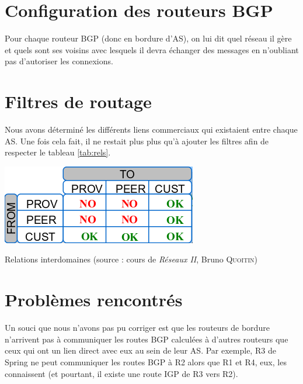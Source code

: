 \documentclass[10pt,a4paper,twocolumn]{article}
\begin{document}
\section{Configuration des routeurs BGP}
Pour chaque routeur BGP (donc en bordure d'AS), on lui dit quel réseau il gère et quels sont ses voisins avec lesquels il devra échanger des messages en n'oubliant pas d'autoriser les connexions.

\section{Filtres de routage}
Nous avons déterminé les différents liens commerciaux qui existaient entre chaque AS. Une fois cela fait, il ne restait plus plus qu'à ajouter les filtres afin de respecter le tableau \ref{tab:rels}.
\begin{table}[h]
	\includegraphics[width=\columnwidth]{comlink.png}
	\caption{Relations interdomaines (source : cours de \textit{Réseaux II}, Bruno \textsc{Quoitin})}
	\label{tab:rels}
\end{table}

\section{Problèmes rencontrés}
Un souci que nous n'avons pas pu corriger est que les routeurs de bordure n'arrivent pas à communiquer les routes BGP calculées à d'autres routeurs que ceux qui ont un lien direct avec eux au sein de leur AS.
Par exemple, R3 de Spring ne peut communiquer les routes BGP à R2 alors que R1 et R4, eux, les connaissent (et pourtant, il existe une route IGP de R3 vers R2).
\end{document}
